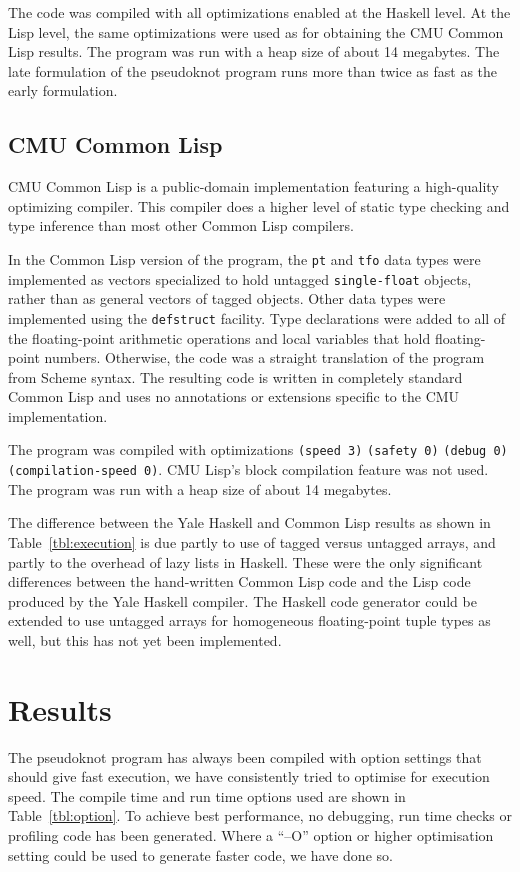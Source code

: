 The code was compiled with all optimizations enabled at the Haskell
level. At the Lisp level, the same optimizations were used as for
obtaining the CMU Common Lisp results. The program was run with a heap
size of about 14 megabytes.
The late formulation of the pseudoknot program runs more than
twice as fast as the early formulation.

\subsection{CMU Common Lisp}
CMU Common Lisp is a public-domain implementation featuring a
high-quality optimizing compiler. This compiler does a higher
level of static type checking and type inference than most other Common
Lisp compilers.

In the Common Lisp version of the program, the \verb=pt= and \verb=tfo=
data types were implemented as vectors specialized to hold untagged
\verb=single-float= objects, rather than as general vectors of tagged
objects. Other data types were implemented using the \verb=defstruct=
facility. Type declarations were added to all of the floating-point
arithmetic operations and local variables that hold floating-point
numbers. Otherwise, the code was a straight translation of the program
from Scheme syntax. The resulting code is written in completely
standard Common Lisp and uses no annotations or extensions specific to
the CMU implementation.

The program was compiled with optimizations \verb=(speed 3)=
\verb=(safety 0)= \verb=(debug 0)= \verb=(compilation-speed 0)=. CMU
Lisp's block compilation feature was not used. The program was run with
a heap size of about 14 megabytes.

The difference between the Yale Haskell and Common Lisp results as shown in
Table~\ref{tbl:execution} is due partly to use of tagged versus
untagged arrays, and partly to the overhead of lazy lists in Haskell.
These were the only significant differences between the hand-written
Common Lisp code and the Lisp code produced by the Yale Haskell compiler. The
Haskell code generator could be extended to use untagged arrays for
homogeneous floating-point tuple types as well, but this has not yet
been implemented.

\section{Results}
\label{sec:results}
The pseudoknot program has always been compiled with option settings
that should give fast execution, we have consistently tried to
optimise for execution speed. The compile time and run time options
used are shown in Table~\ref{tbl:option}. To achieve best performance,
no debugging, run time checks or profiling code has been
generated. Where a ``--O'' option or higher optimisation setting could
be used to generate faster code, we have done so.

